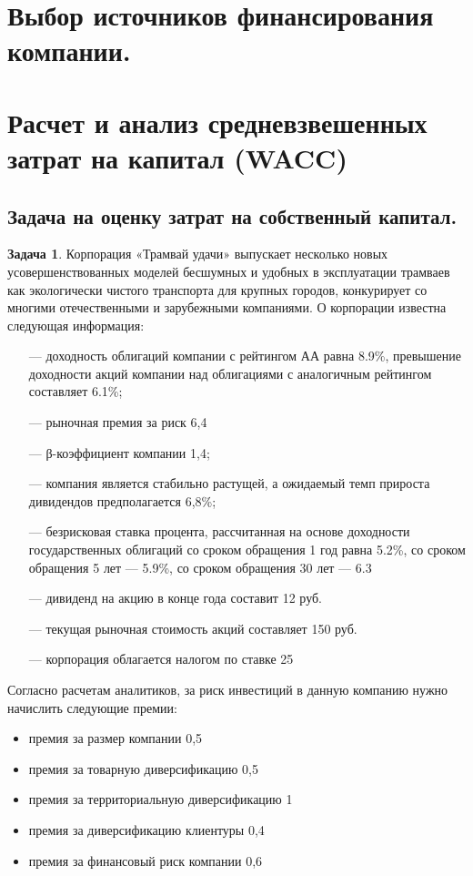 \documentclass[a4paper, 14pt]{article}
\theoremstyle{plain} %
\theoremstyle{definition} %
\newtheorem{problem}{Задача}[subsection]
\theoremstyle{remark} %
\begin{document}
\section{Выбор источников финансирования компании.}

\section{Расчет и анализ средневзвешенных затрат на капитал (WACC)}

\subsection{Задача на оценку затрат на собственный капитал.}
\begin{problem}
		Корпорация «Трамвай удачи» выпускает несколько новых усовершенствованных моделей  бесшумных  и  удобных  в эксплуатации  трамваев  как  экологически  чистого транспорта для крупных городов, конкурирует со многими отечественными и зарубежными компаниями. О корпорации известна следующая информация:
		\begin{itemize}
			\item[---] доходность облигаций компании с рейтингом АА равна 8.9\%, превышение доходности акций компании над облигациями с аналогичным рейтингом составляет 6.1\%;
			\item[---] рыночная премия за риск 6,4%
			\item[---] β-коэффициент компании 1,4;
			\item[---] компания является стабильно растущей, а ожидаемый темп прироста дивидендов предполагается 6,8\%;
			\item[---] безрисковая ставка процента, рассчитанная на основе доходности государственных облигаций со сроком обращения 1 год равна 5.2\%, со сроком обращения 5 лет --- 5.9\%, со сроком обращения 30 лет --- 6.3%
			\item[---] дивиденд на акцию в конце года составит 12 руб.
			\item[---] текущая рыночная стоимость акций составляет 150 руб.
			\item[---] корпорация облагается налогом по ставке 25%
		\end{itemize}

		Согласно расчетам  аналитиков,  за  риск  инвестиций  в  данную  компанию  нужно начислить следующие премии:
		\begin{itemize}
			\item премия за размер компании 0,5%
			\item премия за товарную диверсификацию 0,5%
			\item премия за территориальную диверсификацию 1%
			\item премия за диверсификацию клиентуры 0,4%
			\item премия за финансовый риск компании 0,6%
		\end{itemize}


\end{problem}
\end{document}
